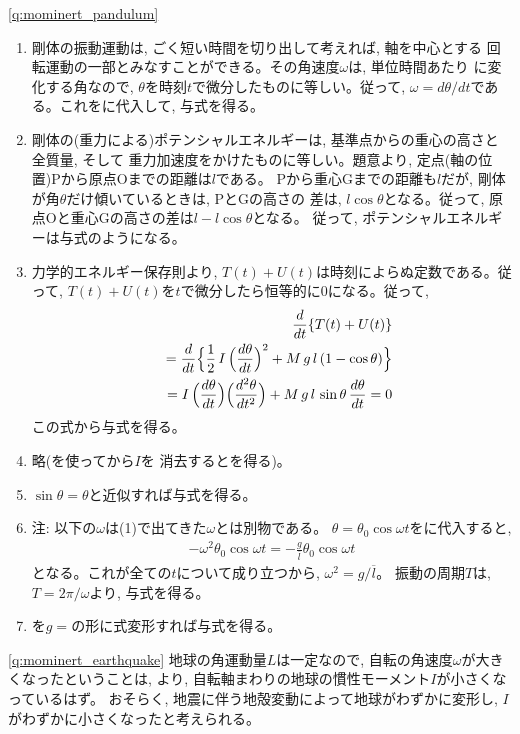 \begin{q}
\ref{q:mominert_pandulum}
\begin{enumerate}
\item 剛体の振動運動は, ごく短い時間を切り出して考えれば, 軸を中心とする
回転運動の一部とみなすことができる。その角速度$\omega$は, 単位時間あたり
に変化する角なので, $\theta$を時刻$t$で微分したものに等しい。従って, 
$\omega=d\theta/dt$である。これをに代入して, 与式を得る。
\item 剛体の(重力による)ポテンシャルエネルギーは, 基準点からの重心の高さと全質量, そして
重力加速度をかけたものに等しい。題意より, 定点(軸の位置)Pから原点Oまでの距離は$l$である。
Pから重心Gまでの距離も$l$だが, 剛体が角$\theta$だけ傾いているときは, PとGの高さの
差は, $l\cos\theta$となる。従って, 原点Oと重心Gの高さの差は$l-l\cos\theta$となる。
従って, ポテンシャルエネルギーは与式のようになる。
\item 力学的エネルギー保存則より, $T(t)+U(t)$は時刻によらぬ定数である。従って, 
$T(t)+U(t)$を$t$で微分したら恒等的に0になる。従って,
\begin{eqnarray*}
&&\frac{d}{dt}\{T(t)+U(t)\}\\
&&=\frac{d}{dt}\Bigl\{\frac{1}{2}\,I\,\Bigl(\frac{d\theta}{dt}\Bigr)^2+M\,g\,l\,(1-\cos \theta)\Bigr\}\\
&&=I\,\Bigl(\frac{d\theta}{dt}\Bigr)\Bigl(\frac{d^2\theta}{dt^2}\Bigr)+M\,g\,l\,\sin \theta\,\frac{d\theta}{dt}=0
\end{eqnarray*}
この式から与式を得る。
\item 略(を使ってから$I$を
消去するとを得る)。
\item $\sin\theta=\theta$と近似すれば与式を得る。
\item 注: 以下の$\omega$は(1)で出てきた$\omega$とは別物である。
$\theta=\theta_0 \cos \omega t$をに代入すると, 
\begin{eqnarray}
-\omega^2\theta_0 \cos \omega t=-\frac{g}{\overline{l}}\theta_0\cos\omega t
\end{eqnarray}
となる。これが全ての$t$について成り立つから, $\omega^2=g/\overline{l}$。
振動の周期$T$は, $T=2\pi/\omega$より, 与式を得る。
\item {}を$g=$の形に式変形すれば与式を得る。
\end{enumerate}
\end{q}
\mv


\ref{q:mominert_earthquake}
地球の角運動量$L$は一定なので, 自転の角速度$\omega$が大きくなったということは, 
より, 自転軸まわりの地球の慣性モーメント$I$が小さくなっているはず。
おそらく, 地震に伴う地殻変動によって地球がわずかに変形し, $I$がわずかに小さくなったと考えられる。
\hv


